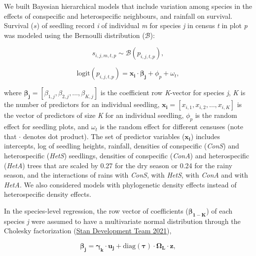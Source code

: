 \documentclass[
  12pt,
  letterpaper,
  DIV=11,
  numbers=noendperiod]{scrartcl}
\begin{document}
We built Bayesian hierarchical models that include variation among
species in the effects of conspecific and heterospecific neighbours, and
rainfall on survival. Survival (\(s\)) of seedling record \emph{i} of
individual \emph{m} for species \emph{j} in census \emph{t} in plot
\emph{p} was modeled using the Bernoulli distribution (\(\mathcal{B}\)):

\[
s_{i,j,m,t,p} \sim \mathcal{B}(p_{i, j, t, p}),
\]

\[
\mathrm{logit}(p_{i,j,t,p}) = \boldsymbol{x_{i}} \cdot \boldsymbol{\beta_{j}} + \phi_p + \omega_t,
\]

where
\(\boldsymbol{\beta_{j}} = \left[\beta_{1,j}, \beta_{2,j}, \ldots, \beta_{K,j} \right]\)
is the coefficient row \emph{K}-vector for species \emph{j}, \emph{K} is
the number of predictors for an individual seedling,
\(\boldsymbol{x_i} = \left[x_{i,1},x _{i,2}, \ldots,x_{i,K} \right]\) is
the vector of predictors of size \emph{K} for an individual seedling,
\(\phi_p\) is the random effect for seedling plots, and \(\omega_t\) is
the random effect for different censuses (note that \(\cdot\) denotes
dot product). The set of predictor variables (\(\boldsymbol{x_i}\))
includes intercepts, log of seedling heights, rainfall, densities of
conspecific (\emph{ConS}) and heterospecific (\emph{HetS}) seedlings,
densities of conspecific (\emph{ConA}) and heterospecific (\emph{HetA})
trees that are scaled by 0.27 for the dry season or 0.24 for the rainy
season, and the interactions of rains with \emph{ConS}, with
\emph{HetS}, with \emph{ConA} and with \emph{HetA}. We also considered
models with phylogenetic density effects instead of heterospecific
density effects.

In the species-level regression, the row vector of coefficients
(\(\boldsymbol{\beta_{1-K}}\)) of each species \emph{j} were assumed to
have a multivariate normal distribution through the Cholesky
factorization (\protect\hyperlink{ref-StanDevelopmentTeam2021}{Stan
Development Team 2021}),

\[
\boldsymbol{\beta_j} = \boldsymbol{\gamma_k} \cdot \boldsymbol{u_j} + \mathrm{diag}(\boldsymbol{\tau})\cdot \boldsymbol{\Omega_L} \cdot \boldsymbol{z},
\]
\end{document}
